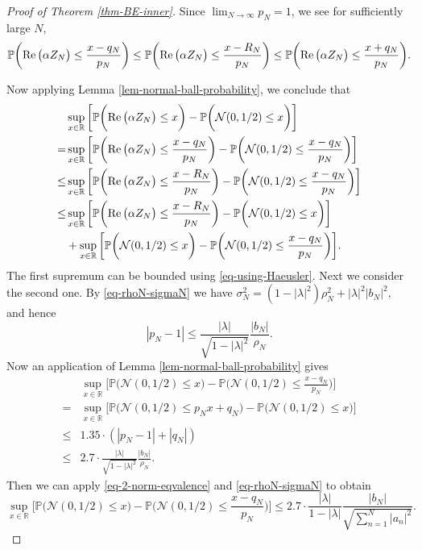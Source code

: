 \documentclass[11pt, reqno]{amsart}
\theoremstyle{definition}
\newtheorem*{Brown-Eagleson Theorem}{The Brown-Eagleson Theorem}
\newcommand{\R}{\mathbb R}
\newcommand{\PP}{\mathbb P}
\newcommand{\cal}{\mathcal}
\begin{document}
\begin{proof}[Proof of Theorem \ref{thm-BE-inner}]
Since $\lim_{N\to \infty}p_N=1$, we see for sufficiently large $N$, 
$$\PP\bigg( {\rm Re}\, \big( \alpha Z_N\big)\leq \frac{x-q_N}{p_N} \bigg) \leq \PP\bigg( {\rm Re}\, \big( \alpha Z_N\big)\leq \frac{x-R_N}{p_N} \bigg) \leq \PP\bigg( {\rm Re}\, \big( \alpha Z_N\big)\leq \frac{x+q_N}{p_N} \bigg).$$ 

Now applying Lemma \ref{lem-normal-ball-probability}, we conclude that 
\begin{align*} 
	& \sup_{x\in \R} \bigg[ \PP\bigg( {\rm Re}\, \big( \alpha Z_N\big)\leq x \bigg)- \PP\bigg( \cal N(0,1/2) \leq x \bigg) \bigg] \\
	= & \sup_{x\in \R} \bigg[ \PP\bigg( {\rm Re}\, \big( \alpha Z_N\big)\leq \frac{x-q_N}{p_N} \bigg)- \PP\bigg( \cal N(0,1/2) \leq \frac{x-q_N}{p_N} \bigg) \bigg] \\
	\leq &  \sup_{x\in \R} \bigg[ \PP\bigg( {\rm Re}\, \big( \alpha Z_N\big)\leq \frac{x-R_N}{p_N} \bigg)- \PP\bigg( \cal N(0,1/2) \leq \frac{x-q_N}{p_N} \bigg) \bigg]\\
	\leq  & \sup_{x\in \R} \bigg[ \PP\bigg( {\rm Re}\, \big( \alpha Z_N\big)\leq \frac{x-R_N}{p_N} \bigg)- \PP\bigg( \cal N(0,1/2) \leq x \bigg) \bigg] \\
	& + \sup_{x\in \R} \bigg[ \PP\bigg( \cal N(0,1/2) \leq x \bigg)- \PP\bigg( \cal N(0,1/2) \leq \frac{x-q_N}{p_N} \bigg) \bigg].
\end{align*}
The first supremum can be bounded using \eqref{eq-using-Haeusler}. Next we consider the second one. By \eqref{eq-rhoN-sigmaN} we have $\sigma_N^2 = (1-|\lambda|^2) \rho^2_N +|\lambda|^2 |b_N|^2,$ and hence $$|p_N-1|\leq \frac{|\lambda|}{\sqrt{1-|\lambda|^2}} \frac{|b_N|}{\rho_N}.$$ Now an application of Lemma \ref{lem-normal-ball-probability} gives 
\begin{align*} 
	& \sup_{x\in \R} \bigg[ \PP\bigg( \cal N(0,1/2) \leq x \bigg)- \PP\bigg( \cal N(0,1/2) \leq \frac{x-q_N}{p_N} \bigg) \bigg] \\
	 =& \sup_{x\in \R} \bigg[ \PP\bigg( \cal N(0,1/2) \leq p_Nx+q_N \bigg)- \PP\bigg( \cal N(0,1/2) \leq x \bigg) \bigg]\\
	 \leq & 1.35\cdot (|p_N-1|+|q_N|) \\
	 \leq & 2.7\cdot \frac{|\lambda|}{\sqrt{1-|\lambda|^2}} \frac{|b_N|}{\rho_N}.
\end{align*}
Then we can apply \eqref{eq-2-norm-eqvalence} and \eqref{eq-rhoN-sigmaN} to obtain
\[
 \sup_{x\in \R} \bigg[ \PP\bigg( \cal N(0,1/2) \leq x \bigg)- \PP\bigg( \cal N(0,1/2) \leq \frac{x-q_N}{p_N} \bigg) \bigg]\leq 2.7\cdot \frac{|\lambda|}{1-|\lambda|} \frac{|b_N|}{\sqrt{\sum_{n=1}^N |a_n|^2}}.
\]
\end{proof}
\end{document}
